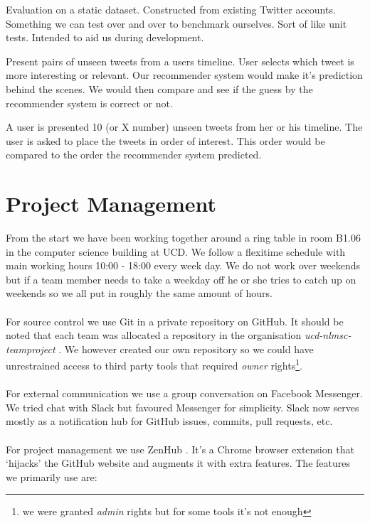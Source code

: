 \documentclass{article}
\begin{document}
\begin{itemize*}
	\item Evaluation on a static dataset. Constructed from existing Twitter accounts. Something we can test over and over to benchmark ourselves. Sort of like unit tests. Intended to aid us during development.
	\item Present pairs of unseen tweets from a users timeline. User selects which tweet is more interesting or relevant. Our recommender system would make it's prediction behind the scenes. We would then compare and see if the guess by the recommender system is correct or not.
	\item A user is presented 10 (or X number) unseen tweets from her or his timeline. The user is asked to place the tweets in order of interest. This order would be compared to the order the recommender system predicted.
\end{itemize*}


\newpage


\section{Project Management}
From the start we have been working together around a ring table in room B1.06 in the computer science building at UCD. We follow a flexitime schedule with main working hours 10:00 - 18:00 every week day. We do not work over weekends but if a team member needs to take a weekday off he or she tries to catch up on weekends so we all put in roughly the same amount of hours.
\\\\
For source control we use Git in a private repository on GitHub. It should be noted that each team was allocated a repository in the organisation \linebreak \mbox{\textit{ucd-nlmsc-teamproject}} \cite{ucdgithub}. We however created our own repository \cite{gitrepo} so we could have unrestrained access to third party tools that required \textit{owner} rights\footnote{we were granted \textit{admin} rights but for some tools it's not enough}.
\\\\
For external communication we use a group conversation on Facebook Messenger. We tried chat with Slack  but favoured Messenger for simplicity. Slack now serves mostly as a notification hub for GitHub issues, commits, pull requests, etc.
\\\\
For project management we use ZenHub \cite{zenhub}. It's a Chrome browser extension that `hijacks' the GitHub website and augments it with extra features. The features we primarily use are:
\end{document}
